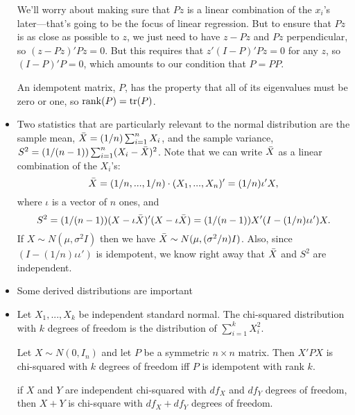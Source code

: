 \begin{itemize}[leftmargin=0pt]
  We'll worry about making sure that $Pz$ is a linear combination of
  the $x_i$'s later---that's going to be the focus of linear regression.
  But to ensure that $P z$ is as close as possible to $z$, we just
  need to have $z - Pz$ and $Pz$ perpendicular, so $(z - Pz)' Pz = 0$.
  But this requires that $z'(I - P)'P z = 0$ for any $z$, so $(I -
  P)'P = 0$, which amounts to our condition that $P = PP$.

  An idempotent matrix, $P$, has the property that all of its
  eigenvalues must be zero or one, so $\operatorname{rank}(P) = \operatorname{tr}(P)$.

\item Two statistics that are particularly relevant to the normal
  distribution are the sample mean, $\bar{X} = (1/n) \sum_{i=1}^n X_i$, and
  the sample variance, $S^2 = (1/(n-1)) \sum_{i=1}^n (X_i - \bar{X})^2$.  Note
  that we can write $\bar{X}$ as a linear combination of the $X_i$'s:
  \begin{equation*}
    \bar{X} = (1/n,...,1/n) \cdot (X_1,...,X_n)' = (1/n) \iota'X,
  \end{equation*}
  where $\iota$ is a vector of $n$ ones, and
  \begin{equation*}
    S^2 = (1/(n-1)) (X - \iota \bar{X})'(X - \iota \bar{X}) = (1/(n-1)) X'(I - (1/n) \iota\iota')X.
  \end{equation*}
  If $X \sim N(\mu, \sigma^2 I)$ then we have $\bar{X} \sim N(\mu, (\sigma^2/n) I)$.  Also,
  since $(I - (1/n) \iota\iota')$ is idempotent, we know right away that $\bar{X}$
  and $S^2$ are independent.

\item Some derived distributions are important

\item %
  \begin{defn}
    Let $X_1,...,X_k$ be independent standard normal.  The
    chi-squared distribution with $k$ degrees of freedom is the
    distribution of $\sum_{i=1}^k X^2_i$.
  \end{defn}

  \begin{thm}
    Let $X \sim N(0, I_n)$ and let $P$ be a symmetric $n \times n$ matrix.
    Then $X'PX$ is chi-squared with $k$ degrees of freedom iff $P$ is
    idempotent with rank $k$.
  \end{thm}

  \begin{thm}
    if $X$ and $Y$ are independent chi-squared with $df_X$ and $df_Y$
    degrees of freedom, then $X + Y$ is chi-square with $df_X + df_Y$
    degrees of freedom.
  \end{thm}


\end{itemize}

